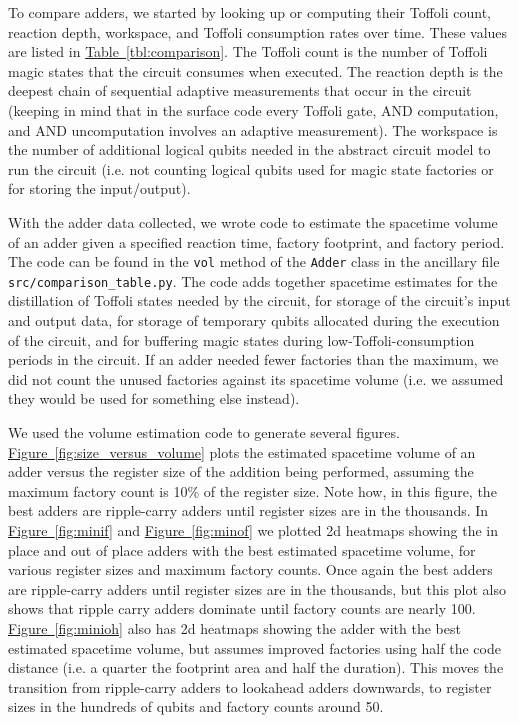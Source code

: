 \documentclass[onecolumn,unpublished]{quantumarticle}
\theoremstyle{definition}
\theoremstyle{definition}
\theoremstyle{definition}
\newcommand{\fig}[1]{\hyperref[fig:#1]{Figure~\ref*{fig:#1}}}
\newcommand{\tbl}[1]{\hyperref[tbl:#1]{Table~\ref*{tbl:#1}}}
\begin{document}
To compare adders, we started by looking up or computing their Toffoli count, reaction depth, workspace, and Toffoli consumption rates over time.
These values are listed in \tbl{comparison}.
The Toffoli count is the number of Toffoli magic states that the circuit consumes when executed.
The reaction depth is the deepest chain of sequential adaptive measurements that occur in the circuit (keeping in mind that in the surface code every Toffoli gate, AND computation, and AND uncomputation involves an adaptive measurement).
The workspace is the number of additional logical qubits needed in the abstract circuit model to run the circuit (i.e. not counting logical qubits used for magic state factories or for storing the input/output).

With the adder data collected, we wrote code to estimate the spacetime volume of an adder given a specified reaction time, factory footprint, and factory period.
The code can be found in the \texttt{vol} method of the \texttt{Adder} class in the ancillary file \texttt{src/comparison\_table.py}.
The code adds together spacetime estimates for the distillation of Toffoli states needed by the circuit, for storage of the circuit's input and output data, for storage of temporary qubits allocated during the execution of the circuit, and for buffering magic states during low-Toffoli-consumption periods in the circuit.
If an adder needed fewer factories than the maximum, we did not count the unused factories against its spacetime volume (i.e. we assumed they would be used for something else instead).

We used the volume estimation code to generate several figures.
\fig{size_versus_volume} plots the estimated spacetime volume of an adder versus the register size of the addition being performed, assuming the maximum factory count is 10\% of the register size.
Note how, in this figure, the best adders are ripple-carry adders until register sizes are in the thousands.
In \fig{minif} and \fig{minof} we plotted 2d heatmaps showing the in place and out of place adders with the best estimated spacetime volume, for various register sizes and maximum factory counts.
Once again the best adders are ripple-carry adders until register sizes are in the thousands, but this plot also shows that ripple carry adders dominate until factory counts are nearly 100.
\fig{minioh} also has 2d heatmaps showing the adder with the best estimated spacetime volume, but assumes improved factories using half the code distance (i.e. a quarter the footprint area and half the duration).
This moves the transition from ripple-carry adders to lookahead adders downwards, to register sizes in the hundreds of qubits and factory counts around 50.
\end{document}
